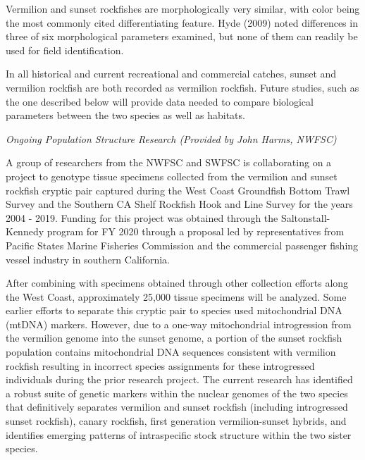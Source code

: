 \documentclass[
  english,
  a4paper,
]{article}
\begin{document}
Vermilion and sunset rockfishes are morphologically very similar, with color being
the most commonly
cited differentiating feature. Hyde (2009) noted differences in three of six morphological
parameters examined, but none of them can readily be used for field identification.

In all historical and current recreational and commercial catches, sunset and
vermilion rockfish are both recorded as vermilion rockfish. Future studies,
such as the one described below will provide data needed to compare biological
parameters between the two species as well as habitats.

\emph{Ongoing Population Structure Research (Provided by John Harms, NWFSC)}

A group of researchers from the NWFSC and SWFSC is collaborating on a project to
genotype tissue specimens collected from the vermilion and sunset rockfish cryptic
pair captured during the West Coast Groundfish Bottom Trawl Survey and the Southern
CA Shelf Rockfish Hook and Line Survey for the years 2004 - 2019. Funding for this
project was obtained through the Saltonstall-Kennedy program for FY 2020 through a
proposal led by representatives from Pacific States Marine Fisheries Commission and
the commercial passenger fishing vessel industry in southern California.

After combining with specimens obtained through other collection efforts along
the West Coast, approximately 25,000 tissue specimens will be analyzed. Some
earlier efforts to separate this cryptic pair to species used mitochondrial DNA
(mtDNA) markers. However, due to a one-way mitochondrial introgression from
the vermilion genome into the sunset genome, a portion of the sunset rockfish
population contains mitochondrial DNA sequences consistent with vermilion rockfish
resulting in incorrect species assignments for these introgressed individuals
during the prior research project. The current research has identified a robust
suite of genetic markers within the nuclear genomes of the two species that
definitively separates vermilion and sunset rockfish (including introgressed
sunset rockfish), canary rockfish, first generation vermilion-sunset hybrids,
and identifies emerging patterns of intraspecific stock structure within the
two sister species.
\end{document}
